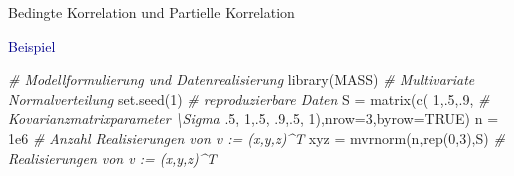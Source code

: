 \documentclass[
  8pt,
  ignorenonframetext,
]{beamer}
\newenvironment{Shaded}{\begin{snugshade}}{\end{snugshade}}
\newcommand{\AttributeTok}[1]{\textcolor[rgb]{0.77,0.63,0.00}{#1}}
\newcommand{\CommentTok}[1]{\textcolor[rgb]{0.56,0.35,0.01}{\textit{#1}}}
\newcommand{\ConstantTok}[1]{\textcolor[rgb]{0.00,0.00,0.00}{#1}}
\newcommand{\DecValTok}[1]{\textcolor[rgb]{0.00,0.00,0.81}{#1}}
\newcommand{\FloatTok}[1]{\textcolor[rgb]{0.00,0.00,0.81}{#1}}
\newcommand{\FunctionTok}[1]{\textcolor[rgb]{0.00,0.00,0.00}{#1}}
\newcommand{\NormalTok}[1]{#1}
\newcommand{\OtherTok}[1]{\textcolor[rgb]{0.56,0.35,0.01}{#1}}
\begin{document}
\begin{frame}[fragile]{Bedingte Korrelation und Partielle Korrelation}
\protect\hypertarget{bedingte-korrelation-und-partielle-korrelation-12}{}
\small

\textcolor{darkblue}{Beispiel} \tiny {} \vspace{1mm}

\begin{Shaded}
\begin{Highlighting}[]
\CommentTok{\# Modellformulierung und Datenrealisierung}
\FunctionTok{library}\NormalTok{(MASS)                                 }\CommentTok{\# Multivariate Normalverteilung}
\FunctionTok{set.seed}\NormalTok{(}\DecValTok{1}\NormalTok{)                                   }\CommentTok{\# reproduzierbare Daten}
\NormalTok{S     }\OtherTok{=} \FunctionTok{matrix}\NormalTok{(}\FunctionTok{c}\NormalTok{( }\DecValTok{1}\NormalTok{,.}\DecValTok{5}\NormalTok{,.}\DecValTok{9}\NormalTok{,                    }\CommentTok{\# Kovarianzmatrixparameter \textbackslash{}Sigma}
\NormalTok{                 .}\DecValTok{5}\NormalTok{, }\DecValTok{1}\NormalTok{,.}\DecValTok{5}\NormalTok{,}
\NormalTok{                 .}\DecValTok{9}\NormalTok{,.}\DecValTok{5}\NormalTok{, }\DecValTok{1}\NormalTok{),}\AttributeTok{nrow=}\DecValTok{3}\NormalTok{,}\AttributeTok{byrow=}\ConstantTok{TRUE}\NormalTok{)}
\NormalTok{n     }\OtherTok{=} \FloatTok{1e6}                                   \CommentTok{\# Anzahl Realisierungen  von v := (x,y,z)\^{}T}
\NormalTok{xyz   }\OtherTok{=} \FunctionTok{mvrnorm}\NormalTok{(n,}\FunctionTok{rep}\NormalTok{(}\DecValTok{0}\NormalTok{,}\DecValTok{3}\NormalTok{),S)                 }\CommentTok{\# Realisierungen         von v := (x,y,z)\^{}T}


\end{Highlighting}
\end{Shaded}
\end{frame}
\end{document}
